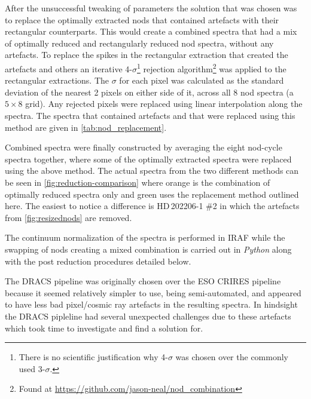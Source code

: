 After the unsuccessful tweaking of parameters the solution that was chosen was to replace the optimally extracted nods that contained artefacts with their rectangular counterparts.
This would create a combined spectra that had a mix of optimally reduced and rectangularly reduced nod spectra, without any artefacts.
To replace the spikes in the rectangular extraction that created the artefacts and others an iterative 4-\(\sigma\)\footnote{There is no scientific justification why 4-\(\sigma\) was chosen over the commonly used 3-\(\sigma\).} rejection algorithm\footnote{Found at \url{https://github.com/jason-neal/nod_combination}} was applied to the rectangular extractions.
The \(\sigma\) for each pixel was calculated as the standard deviation of the nearest 2 pixels on either side of it, across all 8 nod spectra (a $5\times8$ grid).
Any rejected pixels were replaced using linear interpolation along the spectra.
The spectra that contained artefacts and that were replaced using this method are given in \cref{tab:nod_replacement}.

Combined spectra were finally constructed by averaging the eight nod-cycle spectra together, where some of the optimally extracted spectra were replaced using the above method.
The actual spectra from the two different methods can be seen in \cref{fig:reduction-comparison} where orange is the combination of optimally reduced spectra only and green uses the replacement method outlined here.
The easiest to notice a difference is {HD\,202206-1 \#2} in which the artefacts from \cref{fig:resizednods} are removed.

The continuum normalization of the spectra is performed in {IRAF} while the swapping of nods creating a mixed combination is carried out in \emph{Python} along with the post reduction procedures detailed below.

The {DRACS} pipeline was originally chosen over the {ESO} {CRIRES} pipeline because it seemed relatively simpler to use, being semi-automated, and appeared to have less bad pixel/cosmic ray artefacts in the resulting spectra.
In hindsight the {DRACS} pipleline had several unexpected challenges due to these artefacts which took time to investigate and find a solution for.

